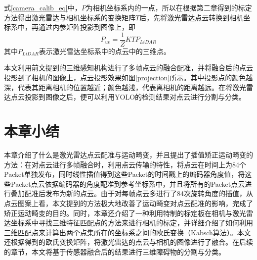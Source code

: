 式\ref{camera_calib_eq}中，$P$为相机坐标系内的一点，所以在根据第二章得到的标定方法得出激光雷达与相机坐标系的变换矩阵$T$后，先将激光雷达点云转换到相机坐标系中，再通过内参矩阵投影到图像上，即
\begin{equation}
    P_{uv} = \frac{1}{Z} KTP_{LiDAR}
\end{equation}
其中$P_{LiDAR}$表示激光雷达坐标系中的点云中的三维点。

本文利用前文提到的三维感知机构进行了多帧点云的融合配准，并将融合后的点云投影到了相机的图像上，点云投影效果如图\ref{projection}所示。其中投影点的颜色越深，代表其距离相机的位置越近；颜色越浅，代表离相机的距离越远。在将激光雷达点云投影到图像之后，便可以利用YOLO的检测结果对点云进行分割与分类。

\section{本章小结}

本章介绍了什么是激光雷达点云配准与运动畸变，并且提出了插值矫正运动畸变的方法：在对点云进行多帧融合时，利用点云传输的特性，将点云在时间上为84个Packet单独发布，同时线性插值得到这些Packet的时间戳上的编码器角度值，将这些Packet点云依据编码器的角度配准到参考坐标系中，并且将所有的Packet点云进行叠加配准后发布为新的点云。由于对每帧点云多进行了84次旋转角度的插值，从点云图案上看，本文提到的方法极大地改善了运动畸变对点云配准的影响，完成了矫正运动畸变的目的。同时，本章还介绍了一种利用特制的标定板在相机与激光雷达坐标系中寻找三维特征匹配点的方法来进行相机的标定，并详细介绍了如何利用三维匹配点来计算出两个点集所在的坐标系之间的欧氏变换（Kabsch算法）。本文还根据得到的欧氏变换矩阵，将激光雷达的点云与相机的图像进行了融合。在后续的章节，本文将基于传感器融合后的结果进行三维障碍物的分割与分类。
